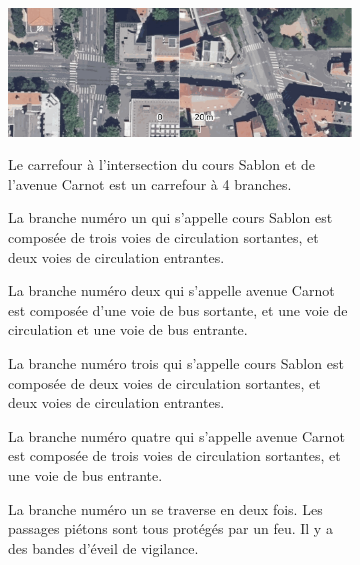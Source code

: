 \begin{figure}[H]
    \begin{subfigure}[t]{\linewidth}
        \centering
        \includegraphics[width=\linewidth]{images/evaluation/ortho_carrefours_eval.png}
    \end{subfigure}
    \begin{subfigure}[t]{\linewidth}
        \centering
        \begin{minipage}[t]{0.49\linewidth}
            \vspace{0pt}
            \scriptsize
            Le carrefour à l'intersection du cours Sablon et de l'avenue Carnot est un carrefour à 4 branches.

            \vspace{5pt}

            La branche numéro un qui s'appelle cours Sablon est composée de trois voies de circulation sortantes, et deux voies de circulation entrantes.

            \vspace{5pt}

            La branche numéro deux qui s'appelle avenue Carnot est composée d'une voie de bus sortante, et une voie de circulation et une voie de bus entrante.

            \vspace{5pt}

            La branche numéro trois qui s'appelle cours Sablon est composée de deux voies de circulation sortantes, et deux voies de circulation entrantes.

            \vspace{5pt}

            La branche numéro quatre qui s'appelle avenue Carnot est composée de trois voies de circulation sortantes, et une voie de bus entrante.

            \vspace{5pt}

            La branche numéro un se traverse en deux fois. Les passages piétons sont tous protégés par un feu. Il y a des bandes d'éveil de vigilance.


\end{minipage}
\end{subfigure}
\end{figure}
